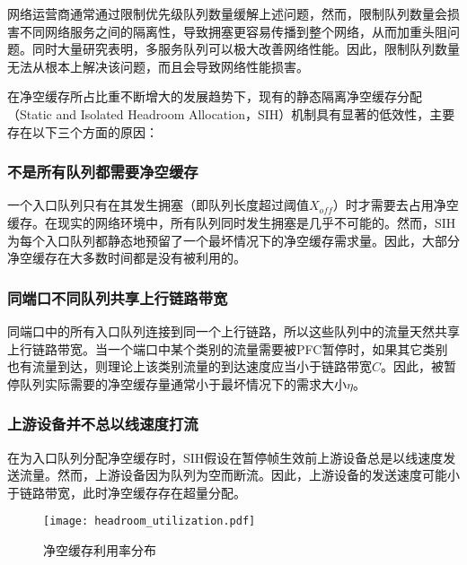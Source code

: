 网络运营商通常通过限制优先级队列数量缓解上述问题\cite{SIGCOMM16RDMA}，然而，限制队列数量会损害不同网络服务之间的隔离性，导致拥塞更容易传播到整个网络，从而加重头阻问题。同时大量研究\cite{SIGCOMM18Homa,NSDI15PIAS,grosvenor2015queues,NSDI18AFQ,SIGCOMM18AuTO}表明，多服务队列可以极大改善网络性能。因此，限制队列数量无法从根本上解决该问题，而且会导致网络性能损害。


在净空缓存所占比重不断增大的发展趋势下，现有的静态隔离净空缓存分配（Static and Isolated Headroom Allocation，SIH）机制具有显著的低效性，主要存在以下三个方面的原因：

\subsubsection{不是所有队列都需要净空缓存}

一个入口队列只有在其发生拥塞（即队列长度超过阈值$X_{off}$）时才需要去占用净空缓存。在现实的网络环境中，所有队列同时发生拥塞是几乎不可能的\cite{bai2023empowering}。然而，SIH为每个入口队列都静态地预留了一个最坏情况下的净空缓存需求量。因此，大部分净空缓存在大多数时间都是没有被利用的。

\subsubsection{同端口不同队列共享上行链路带宽}

同端口中的所有入口队列连接到同一个上行链路，所以这些队列中的流量天然共享上行链路带宽。当一个端口中某个类别的流量需要被PFC暂停时，如果其它类别也有流量到达，则理论上该类别流量的到达速度应当小于链路带宽$C$。因此，被暂停队列实际需要的净空缓存量通常小于最坏情况下的需求大小$\eta$。

\subsubsection{上游设备并不总以线速度打流}

在为入口队列分配净空缓存时，SIH假设在暂停帧生效前上游设备总是以线速度发送流量。然而，上游设备因为队列为空而断流。因此，上游设备的发送速度可能小于链路带宽，此时净空缓存存在超量分配。

\begin{figure}[H]
  \centering
  \texttt{[image: headroom\_utilization.pdf]}
  \caption{净空缓存利用率分布}
  \label{c3:s2:ss1:fig:headroom utilization}
\end{figure}


